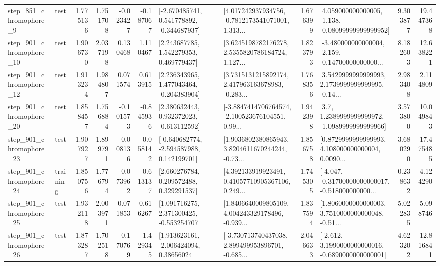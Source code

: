 \begin{tabular}{llrrrrllrlrr}
   step\_851\_chromophore\_9 &      test &      1.775136 &    1.751708 &     -0.023427 & -0.187067 &   [-2.670485741, 0.541778892, -0.344687937] &  [4.017242937934756, -0.7812173541071001, 1.313... &       1.676399 &  [4.059000000000005, -1.138, -0.08099999999999952] &            9.303877 &         19.447368 \\
  step\_901\_chromophore\_10 &      test &      1.906730 &    2.037198 &      0.130468 &  1.110467 &     [2.243687785, 1.542279353, 0.469779437] &  [3.6245198782176278, 2.5355820786184724, 1.127... &       1.823793 &  [-3.480000000000004, -2.159, -0.14700000000000... &            8.182603 &         12.638221 \\
  step\_901\_chromophore\_12 &      test &      1.913234 &    1.984807 &      0.071574 &  0.613915 &    [2.236343965, 1.477043464, -0.204383904] &  [3.7315131215892174, 2.417963163678983, -0.283... &       1.768356 &  [3.5429999999999993, 2.1739999999999995, -0.14... &            2.983408 &          2.114809 \\
  step\_901\_chromophore\_20 &      test &      1.858457 &    1.756884 &     -0.101573 & -0.845936 &    [2.380632443, 0.932372023, -0.613112592] &  [-3.8847414706764574, -2.100523676104551, 0.99... &       1.942398 &     [3.7, 1.2389999999999972, -1.0989999999999966] &            3.573800 &         10.049843 \\
  step\_901\_chromophore\_23 &      test &      1.907927 &    1.899791 &     -0.008136 & -0.058142 &   [-0.640682774, -2.594587988, 0.142199701] &  [1.9036802380865943, 3.8204611670244244, -0.73... &       1.856758 &  [0.8729999999999993, 4.108000000000004, 0.0090... &            3.680290 &         17.475485 \\
  step\_901\_chromophore\_24 &  training &      1.850756 &    1.776794 &     -0.073962 & -0.613137 &     [2.660276784, 0.209572488, 0.329291537] &  [4.392133919923491, 0.41057710905367106, 0.249... &       1.745305 &  [-4.047, -0.31700000000000017, -0.518000000000... &            0.238632 &          4.124290 \\
  step\_901\_chromophore\_25 &      test &      1.932118 &    2.003971 &      0.071853 &  0.616267 &    [1.091716275, 2.371300425, -0.553254707] &  [1.8406640009805109, 4.004243329178496, -0.939... &       1.837594 &  [1.8060000000000003, 3.7510000000000048, -0.51... &            5.022835 &          5.098746 \\
  step\_901\_chromophore\_26 &      test &      1.873287 &    1.702518 &     -0.170769 & -1.429345 &     [1.913623161, -2.006424094, 0.38656024] &  [-3.730713740437038, 2.899499953896701, -0.685... &       2.046633 &  [-2.612, 3.1990000000000016, -0.6890000000000001] &            4.623202 &         12.816841 \\

\end{tabular}
